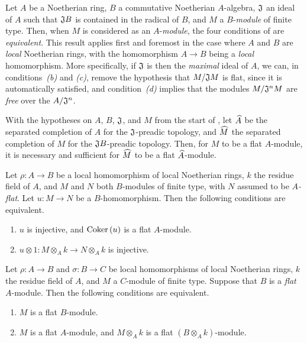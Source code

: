 \begin{env}[10.2.2]
\label{0.10.2.2}
Let $A$ be a Noetherian ring, $B$ a commutative Noetherian $A$-algebra, $\mathfrak{J}$ an ideal of $A$ such that $\mathfrak{J}B$ is contained in the radical of $B$, and $M$ a $B$-\emph{module} of finite type.
Then, when $M$ is considered as an $A$-\emph{module}, the four conditions of  are \emph{equivalent}.
This result applies first and foremost in the case where $A$ and $B$ are \emph{local} Noetherian rings, with the homomorphism $A\to B$ being a \emph{local} homomorphism.
More specifically, if $\mathfrak{J}$ is then the \emph{maximal} ideal of $A$, we can, in conditions~\emph{(b)} and \emph{(c)}, remove the hypothesis that $M/\mathfrak{J}M$ is flat, since it is automatically satisfied, and condition~\emph{(d)} implies that the modules $M/\mathfrak{J}^nM$ are \emph{free} over the $A/\mathfrak{J}^n$.
\end{env}

\begin{env}[10.2.3]
\label{0.10.2.3}
With the hypotheses on $A$, $B$, $\mathfrak{J}$, and $M$ from the start of , let ${\widehat{A}}$ be the separated completion of $A$ for the $\mathfrak{J}$-preadic topology, and ${\widehat{M}}$ the separated completion of $M$ for the $\mathfrak{J}B$-preadic topology.
Then, for $M$ to be a flat $A$-module, it is necessary and sufficient for ${\widehat{M}}$ to be a flat ${\widehat{A}}$-module.
\end{env}

\begin{env}[10.2.4]
\label{0.10.2.4}
Let $\rho:A\to B$ be a local homomorphism of local Noetherian rings, $k$ the residue field of $A$, and $M$ and $N$ both $B$-modules of finite type, with $N$ assumed to be \emph{$A$-flat}.
Let $u:M\to N$ be a $B$-homomorphism.
Then the following conditions are equivalent.
\begin{enumerate}[label=\emph{(\alph*)}]
    \item $u$ is injective, and ${\mathop{\mathrm{Coker}}\nolimits}\,(u)$ is a flat $A$-module.
    \item $u\otimes1:M\otimes_A k\to N\otimes_A k$ is injective.
\end{enumerate}
\end{env}

\begin{env}[10.2.5]
\label{0.10.2.5}
Let $\rho:A\to B$ and $\sigma:B\to C$ be local homomorphisms of local Noetherian rings, $k$ the residue field of $A$, and $M$ a $C$-module of finite type.
Suppose that $B$ is a \emph{flat} $A$-module.
Then the following conditions are equivalent.
\begin{enumerate}[label=\emph{(\alph*)}]
    \item $M$ is a flat $B$-module.
    \item $M$ is a flat $A$-module, and $M\otimes_A k$ is a flat $(B\otimes_A k)$-module.
\end{enumerate}
\end{env}

